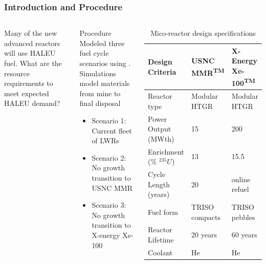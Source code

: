 \begin{frame}
  \frametitle{Introduction and Procedure}
  \begin{columns}
        \column[t]{5cm}
        Many of the new advanced reactors will use \gls{HALEU} fuel. 
        What are the resource requirements to meet expected \gls{HALEU}
        demand?

        \begin{block}{Procedure}
            Modeled three fuel cycle scenarios using \Cyclus. Simulations 
            model materials from mine to final disposal
            \begin{itemize}
                \item Scenario 1: Current fleet of \glspl{LWR}
                \item Scenario 2: No growth transition to \gls{USNC} \gls{MMR}
                \item Scenario 3: No growth transition to X-energy Xe-100
            \end{itemize}
 
        \end{block}
        
        \column[t]{5cm}
        \begin{table}[t!]
            \tiny
            \caption{Mico-reactor design specifications}
            \label{tab:reactor_summary}
            \begin{tabular}{ p{1.25cm} p{1.25cm} p{1.25cm}}
                \hline
                Design Criteria & \gls{USNC} \gls{MMR}\textsuperscript{TM} & 
                    X-Energy Xe-100\textsuperscript{TM} \\\hline
                Reactor type & Modular HTGR & Modular HTGR \\
                Power Output (MWth) & 15 & 200 \\
                Enrichment (\% $^{235}U$) & 13 & 15.5 \\
                Cycle Length (years) & 20 & online refuel\\
                Fuel form & TRISO compacts & TRISO pebbles\\
                Reactor Lifetime & 20 years & 60 years \\
                Coolant & He & He \\
                \hline
            \end{tabular}
        \end{table}   
  \end{columns}
        
\end{frame}

